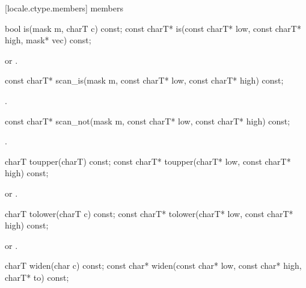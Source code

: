 [locale.ctype.members]{ members}

%
\begin{itemdecl}
bool         is(mask m, charT c) const;
const charT* is(const charT* low, const charT* high, mask* vec) const;
\end{itemdecl}

\begin{itemdescr}
\pnum
\returns
{} or .
\end{itemdescr}

%
\begin{itemdecl}
const charT* scan_is(mask m, const charT* low, const charT* high) const;
\end{itemdecl}

\begin{itemdescr}
\pnum
\returns
{}.
\end{itemdescr}

%
\begin{itemdecl}
const charT* scan_not(mask m, const charT* low, const charT* high) const;
\end{itemdecl}

\begin{itemdescr}
\pnum
\returns
{}.
\end{itemdescr}

%
\begin{itemdecl}
charT        toupper(charT) const;
const charT* toupper(charT* low, const charT* high) const;
\end{itemdecl}

\begin{itemdescr}
\pnum
\returns
{} or .
\end{itemdescr}

%
\begin{itemdecl}
charT        tolower(charT c) const;
const charT* tolower(charT* low, const charT* high) const;
\end{itemdecl}

\begin{itemdescr}
\pnum
\returns
{} or .
\end{itemdescr}

%
\begin{itemdecl}
charT       widen(char c) const;
const char* widen(const char* low, const char* high, charT* to) const;
\end{itemdecl}

